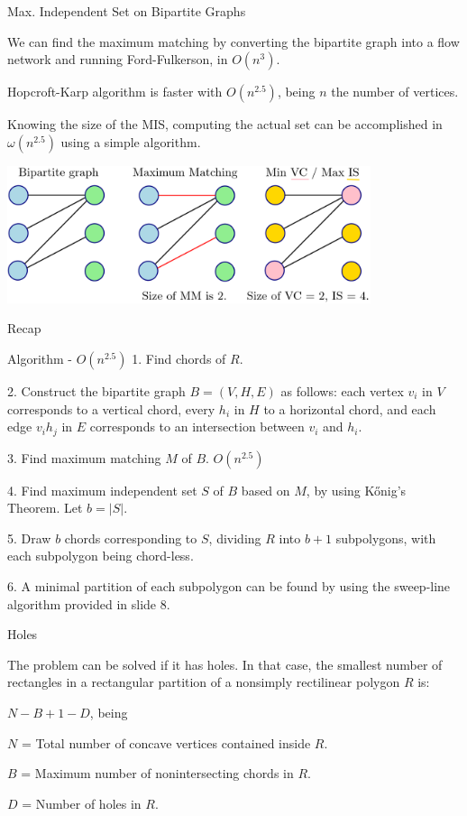 \documentclass{beamer}
\begin{document}
\begin{frame}[t, shrink=10]{Max. Independent Set on Bipartite Graphs}

We can find the maximum matching by converting the bipartite graph into a flow network and running Ford-Fulkerson, in $O(n^3)$. 

Hopcroft-Karp algorithm is faster with $O(n^{2.5})$, being $n$ the number of vertices.

	Knowing the size of the MIS, computing the actual set can be accomplished in $\omega(n^{2.5})$ using a simple algorithm.
	\vspace{10px}

	\centering
    \includegraphics[width=0.8\textwidth]{mis.png}


\end{frame}

\begin{frame}[t, shrink=10]{Recap}

	\begin{block}{Algorithm - $O(n^{2.5})$}
	1. Find chords of $R$.
	
	2. Construct the bipartite graph $B = (V, H, E)$ as follows: each vertex $v_i$ in $V$ corresponds to a vertical chord, every $h_i$ in $H$ to a horizontal chord, and each edge $v_i h_j$ in $E$ corresponds to an intersection between $v_i$ and $h_i$.

	3. Find maximum matching $M$ of $B$. $O(n^{2.5})$
	
	4. Find maximum independent set $S$ of $B$ based on $M$, by using Kőnig's Theorem. Let $b = |S|$.

	5. Draw $b$ chords corresponding to $S$, dividing $R$ into $b + 1$ subpolygons, with each subpolygon being chord-less.
	
	6. A minimal partition of each subpolygon can be found by using the sweep-line algorithm provided in slide 8.
		\end{block}
\end{frame}


\begin{frame}[t]{Holes}

	The problem can be solved if it has holes. In that case, the smallest number of rectangles in a rectangular partition of a nonsimply rectilinear polygon $R$ is:

	\begin{center}
		$N - B + 1 - D$, being 
	\end{center}
	
	$N$ = Total number of concave vertices contained inside $R$. 

	$B$ = Maximum number of nonintersecting chords in $R$. 

	$D$ = Number of holes in $R$. 

\end{frame}
\end{document}
